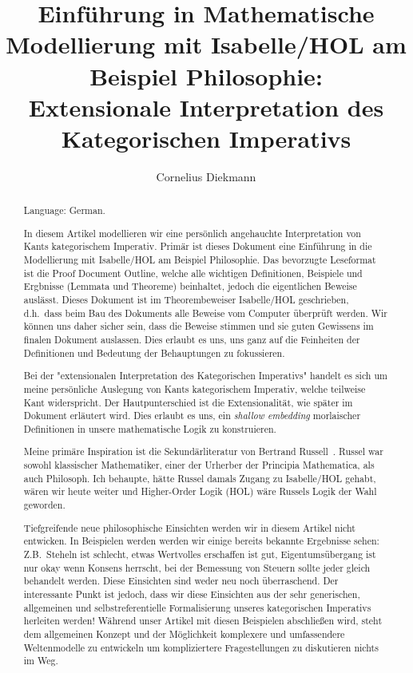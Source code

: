 \documentclass[11pt,a4paper]{article}
\begin{document}
\title{Einführung in Mathematische Modellierung mit Isabelle/HOL am Beispiel Philosophie:\\
Extensionale Interpretation des Kategorischen Imperativs}
\author{Cornelius Diekmann}
\maketitle

\begin{abstract}

Language: German.

\medskip

In diesem Artikel modellieren wir eine persönlich angehauchte
Interpretation von Kants kategorischem Imperativ.
Primär ist dieses Dokument eine Einführung in die Modellierung mit Isabelle/HOL
am Beispiel Philosophie.
Das bevorzugte Leseformat ist die Proof Document Outline,
welche alle wichtigen Definitionen, Beispiele und Ergbnisse (Lemmata und Theoreme) beinhaltet,
jedoch die eigentlichen Beweise auslässt.
Dieses Dokument ist im Theorembeweiser Isabelle/HOL geschrieben,
d.h.\ dass beim Bau des Dokuments alle Beweise vom Computer überprüft werden.
Wir können uns daher sicher sein, dass die Beweise stimmen
und sie guten Gewissens im finalen Dokument auslassen.
Dies erlaubt es uns, uns ganz auf die Feinheiten der Definitionen
und Bedeutung der Behauptungen zu fokussieren.


Bei der "extensionalen Interpretation des Kategorischen Imperativs" handelt es sich
um meine persönliche Auslegung von Kants kategorischem Imperativ,
welche teilweise Kant widerspricht.
Der Hautpunterschied ist die Extensionalität, wie später im Dokument erläutert wird.
Dies erlaubt es uns, ein \emph{shallow embedding} morlaischer Definitionen in
unsere mathematische Logik zu konstruieren.

Meine primäre Inspiration ist die Sekundärliteratur von Bertrand Russell~\cite{russellphi}.
Russel war sowohl klassischer Mathematiker, einer der Urherber der Principia Mathematica,
als auch Philosoph.
Ich behaupte, hätte Russel damals Zugang zu Isabelle/HOL gehabt, wären wir heute weiter
und Higher-Order Logik (HOL) wäre Russels Logik der Wahl geworden.

Tiefgreifende neue philosophische Einsichten werden wir in diesem Artikel nicht entwicken.
In Beispielen werden werden wir einige bereits bekannte Ergebnisse sehen:
Z.B.\ Steheln ist schlecht, etwas Wertvolles erschaffen ist gut,
Eigentumsübergang ist nur okay wenn Konsens herrscht,
bei der Bemessung von Steuern sollte jeder gleich behandelt werden.
Diese Einsichten sind weder neu noch überraschend.
Der interessante Punkt ist jedoch,
dass wir diese Einsichten aus der sehr generischen, allgemeinen und selbstreferentielle Formalisierung
unseres kategorischen Imperativs herleiten werden!
Während unser Artikel mit diesen Beispielen abschließen wird,
steht dem allgemeinen Konzept und der Möglichkeit komplexere
und umfassendere Weltenmodelle zu entwickeln um kompliziertere Fragestellungen zu diskutieren
nichts im Weg.
\end{abstract}
\end{document}
